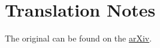 \chapter*{Translation Notes}

The original can be found on the \href{https://arxiv.org/abs/math/0206203}{arXiv}.

